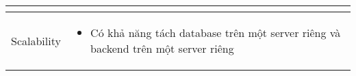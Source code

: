 \begin{center}
\begin{tabular}{ |m{2.5cm}|m{11.5cm}|}
\begin{itemize}
                         \end{itemize}                                                                          \\
        \hline
        Scalability    & \begin{itemize}
            \item Có khả năng tách database trên một server riêng và backend trên một
            server riêng      
        \end{itemize}                                                                                                                                                       \\
        \hline
    \end{tabular}
\end{center}

